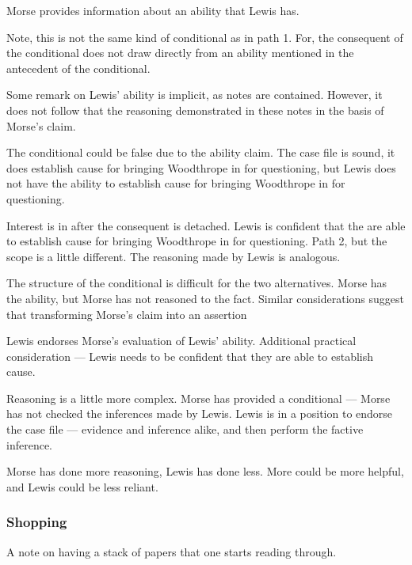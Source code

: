 \documentclass[10pt]{article}
\begin{document}
Morse provides information about an ability that Lewis has.


Note, this is not the same kind of conditional as in path 1.
For, the consequent of the conditional does not draw directly from an ability mentioned in the antecedent of the conditional.

Some remark on Lewis' ability is implicit, as notes are contained.
However, it does not follow that the reasoning demonstrated in these notes in the basis of Morse's claim.

The conditional could be false due to the ability claim.
The case file is sound, it does establish cause for bringing Woodthrope in for questioning, but Lewis does not have the ability to establish cause for bringing Woodthrope in for questioning.

Interest is in after the consequent is detached.
Lewis is confident that the are able to establish cause for bringing Woodthrope in for questioning.
Path 2, but the scope is a little different.
The reasoning made by Lewis is analogous.

The structure of the conditional is difficult for the two alternatives.
Morse has the ability, but Morse has not reasoned to the fact.
Similar considerations suggest that transforming Morse's claim into an assertion 

Lewis endorses Morse's evaluation of Lewis' ability.
Additional practical consideration --- Lewis needs to be confident that they are able to establish cause.



Reasoning is a little more complex.
Morse has provided a conditional --- Morse has not checked the inferences made by Lewis.
Lewis is in a position to endorse the case file --- evidence and inference alike, and then perform the factive inference.







Morse has done more reasoning, Lewis has done less.
More could be more helpful, and Lewis could be less reliant.



\subsubsection{Shopping}
\label{sec:shopping}

\begin{note}
  A note on having a stack of papers that one starts reading through.
\end{note}
\end{document}
